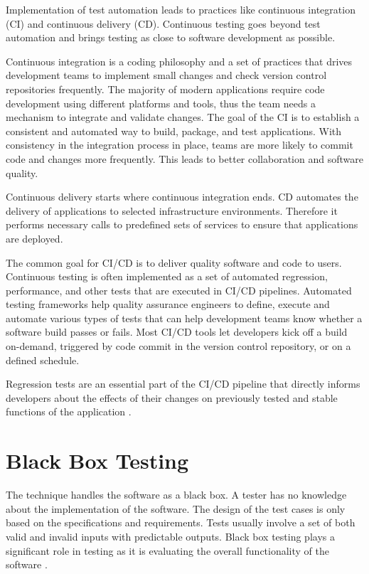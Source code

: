 Implementation of test automation leads to practices like continuous integration (CI) and continuous delivery (CD). Continuous testing goes beyond test automation and brings testing as close to software development as possible.

Continuous integration is a coding philosophy and a set of practices that drives development teams to implement small changes and check version control repositories frequently. The majority of modern applications require code development using different platforms and tools, thus the team needs a mechanism to integrate and validate changes. The goal of the CI is to establish a consistent and automated way to build, package, and test applications. With consistency in the integration process in place, teams are more likely to commit code and changes more frequently. This leads to better collaboration and software quality.

Continuous delivery starts where continuous integration ends. CD automates the delivery of applications to selected infrastructure environments. Therefore it performs necessary calls to predefined sets of services to ensure that applications are deployed.

The common goal for CI/CD is to deliver quality software and code to users. Continuous testing is often implemented as a set of automated regression, performance, and other tests that are executed in CI/CD pipelines. Automated testing frameworks help quality assurance engineers to define, execute and automate various types of tests that can help development teams know whether a software build passes or fails. Most CI/CD tools let developers kick off a build on-demand, triggered by code commit in the version control repository, or on a defined schedule. 

Regression tests are an essential part of the CI/CD pipeline that directly informs developers about the effects of their changes on previously tested and stable functions of the application \cite{CI}.  

\section{Black Box Testing}
The technique handles the software as a black box. A tester has no knowledge about the implementation of the software. The design of the test cases is only based on the specifications and requirements. Tests usually involve a set of both valid and invalid inputs with predictable outputs. Black box testing plays a significant role in testing as it is evaluating the overall functionality of the software \cite{white_black}.

